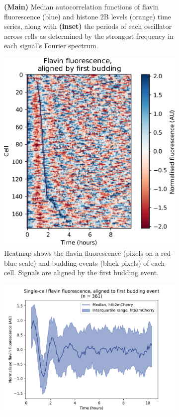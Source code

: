\begin{figure}
\begin{subfigure}[htpb]{0.4\textwidth}
   \caption{
     \textbf{(Main)} Median autocorrelation functions of flavin fluorescence (blue) and histone 2B levels (orange) time series,
     along with \textbf{(inset)} the periods of each oscillator across cells as determined by the strongest frequency in each signal's Fourier spectrum.
   }
   \label{fig:biology-highglc-sync-acf}
  \end{subfigure}

  \begin{subfigure}[htpb]{0.4\textwidth}
   \centering
   \includegraphics[width=\textwidth]{heatmap_edit.pdf}
   \caption{
     Heatmap shows the flavin fluorescence (pixels on a red-blue scale) and budding events (black pixels) of each cell.
     Signals are aligned by the first budding event.
   }
   \label{fig:biology-highglc-sync-heatmap}
  \end{subfigure}%
  \begin{subfigure}[htpb]{0.4\textwidth}
   \centering
   \includegraphics[width=\textwidth]{htb2mCherry_26643_6}

\end{subfigure}
\end{figure}
